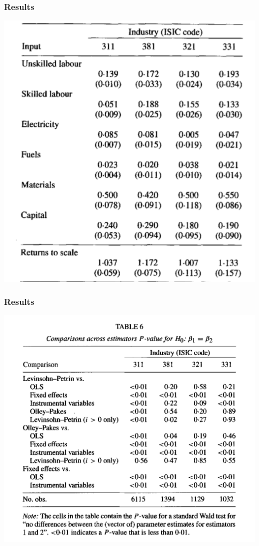 \documentclass[11pt, aspectratio=169]{beamer}
\begin{document}
\begin{frame}[c]\frametitle{Results}

\centering    
\includegraphics[height=.95\textheight]{LP-Table3.png}

\end{frame}


\begin{frame}[c]\frametitle{Results}

\centering    
\includegraphics[height=.95\textheight]{LP-Table6.png}

\end{frame}
\end{document}
